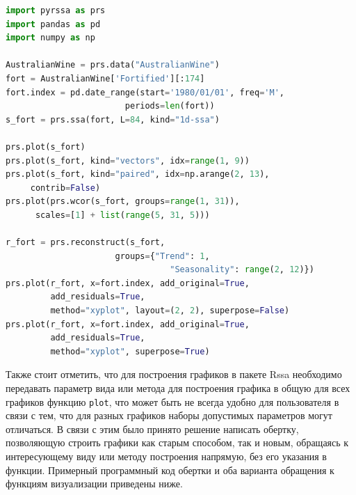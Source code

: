 \documentclass[specialist,
			   substylefile = spbu_report.rtx,
			   subf,href,colorlinks=true, 12pt]{disser}
\begin{document}
\begin{lstlisting}[language=Python, caption=Программный код для визуализации разложения и восстановления ряда AustralianWine на языке Python.]
import pyrssa as prs
import pandas as pd
import numpy as np

AustralianWine = prs.data("AustralianWine")
fort = AustralianWine['Fortified'][:174]
fort.index = pd.date_range(start='1980/01/01', freq='M', 
                        periods=len(fort))
s_fort = prs.ssa(fort, L=84, kind="1d-ssa")

prs.plot(s_fort)
prs.plot(s_fort, kind="vectors", idx=range(1, 9))
prs.plot(s_fort, kind="paired", idx=np.arange(2, 13), 
	 contrib=False)
prs.plot(prs.wcor(s_fort, groups=range(1, 31)),
      scales=[1] + list(range(5, 31, 5)))

r_fort = prs.reconstruct(s_fort,
                      groups={"Trend": 1, 
                     	         "Seasonality": range(2, 12)})
prs.plot(r_fort, x=fort.index, add_original=True, 
         add_residuals=True,
         method="xyplot", layout=(2, 2), superpose=False)
prs.plot(r_fort, x=fort.index, add_original=True, 
         add_residuals=True,
         method="xyplot", superpose=True)
\end{lstlisting}

Также стоит отметить, что для построения графиков в пакете Rssa необходимо передавать параметр вида или метода для построения графика в общую для всех графиков функцию \verb|plot|, что может быть не всегда удобно для пользователя в связи с тем, что для разных графиков наборы допустимых параметров могут отличаться. В связи с этим было принято решение написать обертку, позволяющую строить графики как старым способом, так и новым, обращаясь к интересующему виду или методу построения напрямую, без его указания в функции. Примерный программный код обертки и оба варианта обращения к функциям визуализации приведены ниже.
\end{document}
